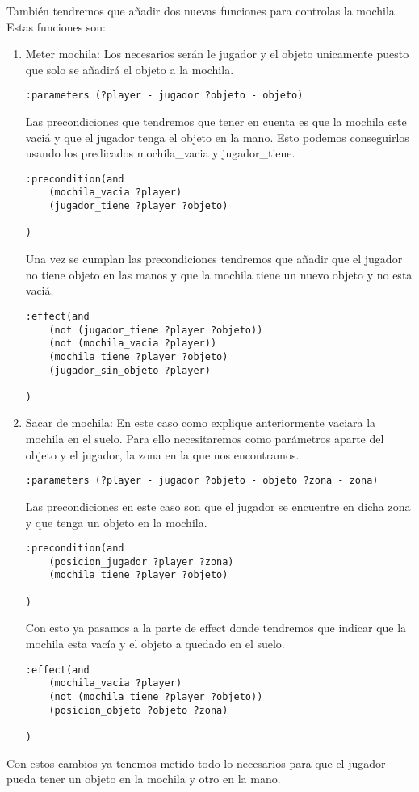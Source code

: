\documentclass[]{article}
\begin{document}
También tendremos que añadir dos nuevas funciones para controlas la mochila. Estas funciones son: 
\begin{enumerate}
\item{Meter mochila:} Los necesarios serán le jugador y el objeto unicamente puesto que solo se añadirá el objeto a la mochila. 
\begin{lstlisting}
:parameters (?player - jugador ?objeto - objeto)
\end{lstlisting}
Las precondiciones que tendremos que tener en cuenta es que la mochila este vaciá y que el jugador tenga el objeto en la mano. Esto podemos conseguirlos usando los predicados mochila\_vacia y jugador\_tiene. 

\begin{lstlisting}
:precondition(and			
	(mochila_vacia ?player)
	(jugador_tiene ?player ?objeto)

)
\end{lstlisting}

Una vez se cumplan las precondiciones tendremos que añadir que el jugador no tiene objeto en las manos y que la mochila tiene un nuevo objeto y no esta vaciá.
\begin{lstlisting}
:effect(and 
	(not (jugador_tiene ?player ?objeto))
	(not (mochila_vacia ?player))
	(mochila_tiene ?player ?objeto)
	(jugador_sin_objeto ?player)

)

\end{lstlisting}
\item{Sacar de mochila:} En este caso como explique anteriormente vaciara la mochila en el suelo. Para ello necesitaremos como parámetros aparte del objeto y el jugador, la zona en la que nos encontramos.
\begin{lstlisting}
:parameters (?player - jugador ?objeto - objeto ?zona - zona)
\end{lstlisting}
Las precondiciones en este caso son que el jugador se encuentre en dicha zona y que tenga un objeto en la mochila.
\begin{lstlisting}
:precondition(and			
	(posicion_jugador ?player ?zona)
	(mochila_tiene ?player ?objeto)

)
\end{lstlisting}
Con esto ya pasamos a la parte de effect donde tendremos que indicar que la mochila esta vacía y el objeto a quedado en el suelo.
\begin{lstlisting}
:effect(and 
	(mochila_vacia ?player)
	(not (mochila_tiene ?player ?objeto))
	(posicion_objeto ?objeto ?zona)

)
\end{lstlisting}
\end{enumerate}
Con estos cambios ya tenemos metido todo lo necesarios para que el jugador pueda tener un objeto en la mochila y otro en la mano.
\end{document}
